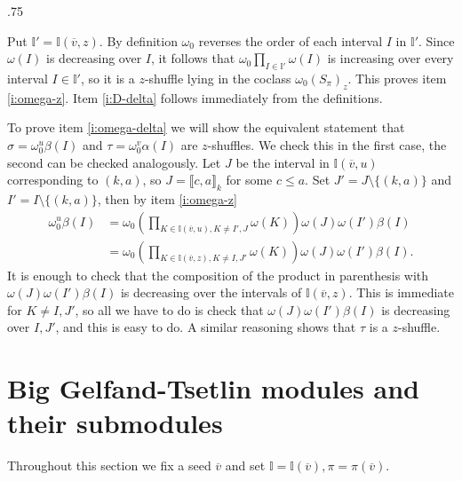\documentclass[11pt,fleqn]{amsart}
\makeatletter
\renewcommand\proofname{Proof}
\renewenvironment{proof}[1][\textit{\proofname}]{\par
 \pushQED{\qed}%
 \normalfont \topsep.75\paraskip\relax
 \trivlist
 \item[\hskip\labelsep
 \itshape
 #1\@addpunct{.}]\ignorespaces
}{%
 \popQED\endtrivlist\@endpefalse
}
\newcounter{para}[section]
\newcommand\vv{\overline{v}}
\newcommand\II{\mathbb I}
\newcommand\interval[1]{\llbracket #1 \rrbracket}
\makeatother
\begin{document}
\begin{proof}
Put $\II' = \II(\vv,z)$.
By definition $\omega_0$ reverses the order of each interval $I$ in $\II'$. 
Since $\omega(I)$ is decreasing over $I$, it follows that $\omega_0 \prod_{I 
\in \II'} \omega(I)$ is increasing over every interval $I \in \II'$, so it is 
a $z$-shuffle lying in the coclass $\omega_0 (S_\pi)_z$. This proves item 
\ref{i:omega-z}. Item \ref{i:D-delta} follows immediately from the 
definitions. 

To prove item \ref{i:omega-delta} we will show the equivalent statement that  
$\sigma = \omega_0^u \beta(I)$ and $\tau = \omega_0^v \alpha(I)$ are 
$z$-shuffles. We check this in the first case, the
second can be checked analogously. Let $J$ be the interval in $\II(\vv,u)$
corresponding to $(k,a)$, so $J = \interval{c,a}_k$ for some $c \leq a$. Set
$J' = J \setminus \{(k,a)\}$ and $I' = I \setminus \{(k,a)\}$, then by item
\ref{i:omega-z}
\begin{align*}
\omega_0^u \beta(I)
	&= \omega_0 \left( \prod_{K \in \II(\vv, u), K \neq I',J} \omega(K) \right)
		\omega(J)\omega(I')\beta(I) \\
	&= \omega_0 \left( \prod_{K \in \II(\vv, z), K \neq I,J'} \omega(K) \right)
		\omega(J)\omega(I')\beta(I).
\end{align*}
It is enough to check that the composition of the product in parenthesis with 
$\omega(J)\omega(I')\beta(I)$ is decreasing over the intervals of 
$\II(\vv,z)$. This is immediate for $K \neq I, J'$, so all we have to 
do is check that $\omega(J)\omega(I')\beta(I)$ is decreasing over $I, J'$, and 
this is easy to do. A similar reasoning shows that $\tau$ is a $z$-shuffle.
\end{proof}

\section{Big Gelfand-Tsetlin modules and their submodules}
Throughout this section we fix a seed $\vv$ and set $\II = \II(\vv), \pi = 
\pi(\vv)$.
\end{document}
